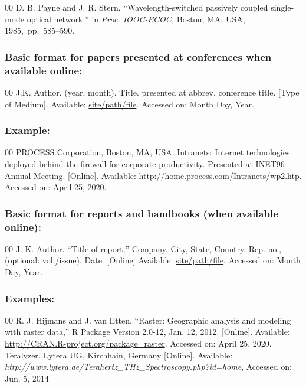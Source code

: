 \begin{thebibliography}{00}
 D. B. Payne and J. R. Stern, ``Wavelength-switched
passively coupled single-mode optical network,'' in \textit{Proc. IOOC-ECOC, }Boston, MA, USA, 1985,~pp.~585--590.
\end{thebibliography}

\subsubsection*{Basic format for papers presented at conferences when available online: }

\begin{thebibliography}{00}
 J.K. Author. (year, month). Title. presented at abbrev. conference title.
[Type of Medium]. Available: \underline{site/path/file}. Accessed on: Month Day, Year.
\end{thebibliography}

\subsubsection*{Example:}

\begin{thebibliography}{00}
 PROCESS Corporation, Boston, MA, USA. Intranets: Internet technologies deployed behind the firewall for corporate productivity. Presented at INET96 Annual Meeting. [Online]. Available: \underline {http://home.process.com/Intranets/wp2.htp}. Accessed on: April 25, 2020.
\end{thebibliography}

\subsubsection*{Basic format for reports and handbooks (when available online): }

\begin{thebibliography}{00}
 J. K. Author. ``Title of report,'' Company. City, State, Country. Rep. no.,
(optional: vol./issue), Date. [Online] Available:
\underline{site/path/file}. Accessed
on: Month Day, Year.
\end{thebibliography}

\subsubsection*{Examples:}

\begin{thebibliography}{00}
 R. J. Hijmans and J. van Etten, ``Raster: Geographic analysis and modeling with raster data,'' R Package Version 2.0-12, Jan. 12, 2012. [Online]. Available: \underline {http://CRAN.R-project.org/package=raster}. Accessed on: April 25, 2020.
 Teralyzer. Lytera UG, Kirchhain, Germany [Online]. Available: \emph{http://www.lytera.de/Terahertz\_THz\_Spectroscopy.php?id=home}, Accessed on: Jun. 5, 2014
\end{thebibliography}

